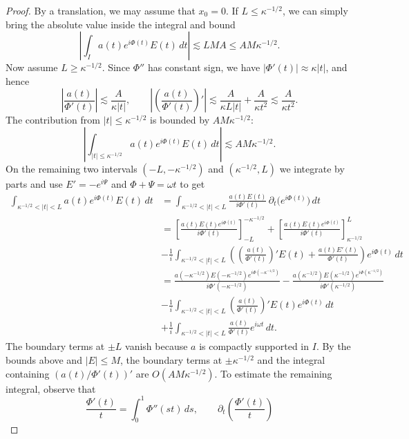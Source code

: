 \documentclass[11pt]{amsart}
\theoremstyle{definition}
\theoremstyle{remark}
\numberwithin{equation}{section}
\begin{document}
\begin{proof}
    By a translation, we may assume that $x_0 = 0$. If $L \leq \kappa^{-1/2}$, we can simply bring the absolute value inside the integral and bound
    \[\left|\int_{I}a(t)e^{i\Phi(t)}E(t) \, dt\right| \lesssim LMA \leq AM \kappa^{-1/2}.\]
    Now assume $L \geq \kappa^{-1/2}$. Since $\Phi''$ has constant sign, we have $|\Phi'(t)|\approx\kappa|t|$, and hence
    \[
        \left|\frac{a(t)}{\Phi'(t)}\right|\lesssim\frac{A}{\kappa|t|},
        \qquad
        \left|\left(\frac{a(t)}{\Phi'(t)}\right)'\right|
        \lesssim\frac{A}{\kappa L|t|}+\frac{A}{\kappa t^2}
        \lesssim\frac{A}{\kappa t^2}.
    \]
    The contribution from $|t|\leq\kappa^{-1/2}$ is bounded by $AM\kappa^{-1/2}$:
    \[\left|\int_{|t| \leq \kappa^{-1/2}}a(t)e^{i\Phi(t)}E(t) \, dt\right| \lesssim AM\kappa^{-1/2}.\]
    On the remaining two intervals $(-L, -\kappa^{-1/2})$ and $(\kappa^{-1/2}, L)$ we integrate by parts and use $E'=-e^{i\Psi}$ and $\Phi+\Psi=\omega t$ to get
    \begin{align*}
        \int_{\kappa^{-1/2}<|t|<L}a(t)e^{i\Phi(t)}E(t)\,dt 
        &=\int_{\kappa^{-1/2}<|t|<L}
        \frac{a(t)E(t)}{i\Phi'(t)}\,\partial_t\bigl(e^{i\Phi(t)}\bigr)\,dt \\
        &=\left[\frac{a(t)E(t)e^{i\Phi(t)}}{i\Phi'(t)}\right]_{-L}^{-\kappa^{-1/2}}
        +\left[\frac{a(t)E(t)e^{i\Phi(t)}}{i\Phi'(t)}\right]_{\kappa^{-1/2}}^L \\
        &-\frac1i\int_{\kappa^{-1/2}<|t|<L}
        \left(\left(\frac{a(t)}{\Phi'(t)}\right)'E(t)
        +\frac{a(t)E'(t)}{\Phi'(t)}\right)e^{i\Phi(t)}\,dt \\
        &=\frac{a(-\kappa^{-1/2})E(-\kappa^{-1/2})e^{i\Phi(-\kappa^{-1/2})}}{i\Phi'(-\kappa^{-1/2})}
        -\frac{a(\kappa^{-1/2})E(\kappa^{-1/2})e^{i\Phi(\kappa^{-1/2})}}{i\Phi'(\kappa^{-1/2})} \\
        &-\frac1i\int_{\kappa^{-1/2}<|t|<L}
        \left(\frac{a(t)}{\Phi'(t)}\right)'E(t)e^{i\Phi(t)}\,dt \\
        &+\frac1i\int_{\kappa^{-1/2}<|t|<L}
        \frac{a(t)}{\Phi'(t)}e^{i\omega t}\,dt.
    \end{align*}
    The boundary terms at $\pm L$ vanish because $a$ is compactly supported in $I$. By the bounds above and $|E|\leq M$, the boundary terms at $\pm\kappa^{-1/2}$ and the integral containing $(a(t)/\Phi'(t))'$ are $O(AM\kappa^{-1/2})$.
    To estimate the remaining integral, observe that
    \[
        \frac{\Phi'(t)}t=\int_0^1\Phi''(st)\,ds,
        \qquad
        \partial_t\!\left(\frac{\Phi'(t)}t\right)
\]
\end{proof}
\end{document}

